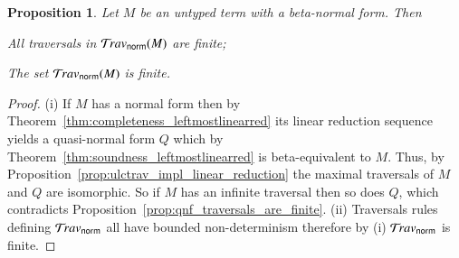 \documentclass{elsarticle}
\theoremstyle{plain}
\newtheorem{proposition}[theorem]{Proposition}
\theoremstyle{definition}
\newcommand{\normalizing}{{\sf norm}}
\newcommand{\travsetnorm}{\travset_\normalizing} %
\begin{document}
\begin{proposition}
\label{prop:ulc_travnorm_finite}
Let $M$ be an untyped term with a beta-normal form. Then
\begin{enumerate*}[label=(\roman*)]
\item All traversals in $\travsetnorm(M)$ are finite;
\item The set $\travsetnorm(M)$ is finite.
\end{enumerate*}
\end{proposition}
\begin{proof}
(i) If $M$ has a normal form then by Theorem~\ref{thm:completeness_leftmostlinearred} its linear reduction sequence yields a quasi-normal form $Q$ which by Theorem~\ref{thm:soundness_leftmostlinearred} is beta-equivalent to $M$. Thus, by Proposition~\ref{prop:ulctrav_impl_linear_reduction} the maximal traversals of $M$ and $Q$ are isomorphic. So if $M$ has an infinite traversal then so does $Q$, which contradicts Proposition~\ref{prop:qnf_traversals_are_finite}.
(ii) Traversals rules defining $\travsetnorm$ all have bounded non-determinism therefore by (i) $\travsetnorm$ is finite.
\end{proof}

\end{document}
